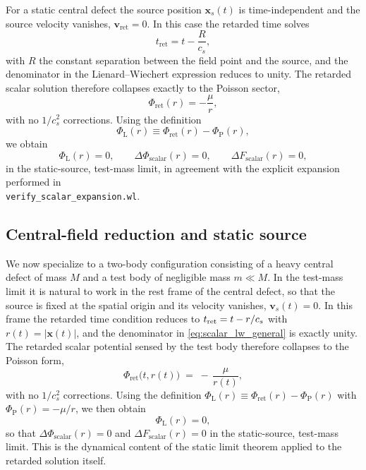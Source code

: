 \documentclass[11pt]{article}
\newcommand{\cS}{c_s}
\newcommand{\PhiP}{\Phi_{\mathrm{P}}}
\newcommand{\PhiL}{\Phi_{\mathrm{L}}}
\begin{document}
For a static central defect the source position $\mathbf{x}_s(t)$ is time-independent and the source velocity vanishes, $\mathbf{v}_{\mathrm{ret}} = 0$. In this case the retarded time solves
\begin{equation}
  t_{\mathrm{ret}} = t - \frac{R}{\cS},
\end{equation}
with $R$ the constant separation between the field point and the source, and the denominator in the Lienard--Wiechert expression reduces to unity. The retarded scalar solution therefore collapses exactly to the Poisson sector,
\begin{equation}
  \Phi_{\mathrm{ret}}(r) = -\frac{\mu}{r},
\end{equation}
with no $1/\cS^2$ corrections. Using the definition
\begin{equation}
  \PhiL(r) \equiv \Phi_{\mathrm{ret}}(r) - \PhiP(r),
\end{equation}
we obtain
\begin{equation}
  \PhiL(r) = 0,
  \qquad
  \Delta \Phi_{\mathrm{scalar}}(r) = 0,
  \qquad
  \Delta F_{\mathrm{scalar}}(r) = 0,
\end{equation}
in the static-source, test-mass limit, in agreement with the explicit expansion performed in\\
\texttt{verify\_scalar\_expansion.wl}.

\subsection{Central-field reduction and static source}

We now specialize to a two-body configuration consisting of a heavy central
defect of mass $M$ and a test body of negligible mass $m\ll M$.  In the
test-mass limit it is natural to work in the rest frame of the central defect,
so that the source is fixed at the spatial origin and its velocity vanishes,
$\mathbf{v}_s(t) = 0$.  In this frame the retarded time condition reduces to
$t_{\rm ret} = t - r/\cS$ with $r(t) = |\mathbf{x}(t)|$, and the denominator in
\eqref{eq:scalar_lw_general} is exactly unity.  The retarded scalar potential
sensed by the test body therefore collapses to the Poisson form,
\begin{equation}
  \Phi_{\mathrm{ret}}\bigl(t, r(t)\bigr)
  \;=\;
  -\,\frac{\mu}{r(t)},
  \label{eq:scalar_static_phi}
\end{equation}
with no $1/\cS^2$ corrections.  Using the definition
$\PhiL(r) \equiv \Phi_{\mathrm{ret}}(r) - \PhiP(r)$ with $\PhiP(r) = -\mu/r$,
we then obtain
\begin{equation}
  \PhiL(r) = 0,
\end{equation}
so that $\Delta \Phi_{\mathrm{scalar}}(r) = 0$ and
$\Delta F_{\mathrm{scalar}}(r) = 0$ in the static-source, test-mass limit.
This is the dynamical content of the static
limit theorem applied to the retarded solution itself.
\end{document}
